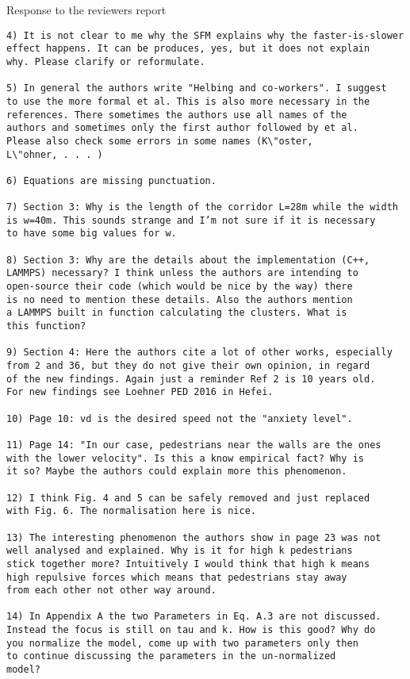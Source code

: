 \documentclass[a4paper,12pt]{letter}
\begin{document}
\begin{letter}{Response to the reviewers report}
\begin{verbatim}
4) It is not clear to me why the SFM explains why the faster-is-slower 
effect happens. It can be produces, yes, but it does not explain 
why. Please clarify or reformulate.

5) In general the authors write "Helbing and co-workers". I suggest 
to use the more formal et al. This is also more necessary in the 
references. There sometimes the authors use all names of the 
authors and sometimes only the first author followed by et al. 
Please also check some errors in some names (K\"oster, 
L\"ohner, . . . )

6) Equations are missing punctuation.

7) Section 3: Why is the length of the corridor L=28m while the width 
is w=40m. This sounds strange and I’m not sure if it is necessary 
to have some big values for w.

8) Section 3: Why are the details about the implementation (C++, 
LAMMPS) necessary? I think unless the authors are intending to 
open-source their code (which would be nice by the way) there 
is no need to mention these details. Also the authors mention 
a LAMMPS built in function calculating the clusters. What is
this function?

9) Section 4: Here the authors cite a lot of other works, especially 
from 2 and 36, but they do not give their own opinion, in regard 
of the new findings. Again just a reminder Ref 2 is 10 years old. 
For new findings see Loehner PED 2016 in Hefei.

10) Page 10: vd is the desired speed not the "anxiety level".

11) Page 14: "In our case, pedestrians near the walls are the ones 
with the lower velocity". Is this a know empirical fact? Why is 
it so? Maybe the authors could explain more this phenomenon. 

12) I think Fig. 4 and 5 can be safely removed and just replaced 
with Fig. 6. The normalisation here is nice.

13) The interesting phenomenon the authors show in page 23 was not 
well analysed and explained. Why is it for high k pedestrians 
stick together more? Intuitively I would think that high k means 
high repulsive forces which means that pedestrians stay away 
from each other not other way around.

14) In Appendix A the two Parameters in Eq. A.3 are not discussed. 
Instead the focus is still on tau and k. How is this good? Why do 
you normalize the model, come up with two parameters only then 
to continue discussing the parameters in the un-normalized 
model?


\end{verbatim}
\end{letter}
\end{document}
